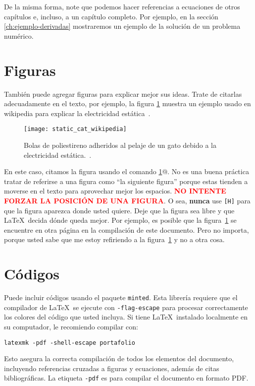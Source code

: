 \documentclass[../portafolio.tex]{subfiles}
\begin{document}
De la misma forma, note que podemos hacer referencias a ecuaciones de otros capítulos e, incluso, a un capítulo completo. Por ejemplo, en la sección \ref{ch:ejemplo-derivadas} mostraremos un ejemplo de la solución de un problema numérico.

\section{Figuras}
También puede agregar figuras para explicar mejor sus ideas. Trate de
citarlas adecuadamente en el texto, por ejemplo, la figura
\ref{fig:estatica} muestra un ejemplo usado en wikipedia
para explicar la electricidad estática~\cite{wikistatic}.
\begin{figure}[ht!]
  \centering
  \texttt{[image: static\_cat\_wikipedia]}
  \caption{Bolas de poliestireno adheridos al pelaje de un gato debido
    a la electricidad estática.~\cite{wikistatic}.}
  \label{fig:estatica}
\end{figure}

En este caso, citamos la figura usando el comando \verb@\ref{fig:estatica}@. No es una buena práctica tratar de referirse a una figura como ``la siguiente figura'' porque estas tienden a moverse en el texto para aprovechar mejor los espacios. \textcolor{red}{\bf NO INTENTE FORZAR LA POSICIÓN DE UNA FIGURA}. O sea, \textbf{nunca} use \texttt{[H]} para que la figura aparezca donde usted quiere. Deje que la figura sea libre y que \LaTeX\ decida dónde queda mejor. Por ejemplo, es posible que la figura~\ref{fig:estatica} se encuentre en otra página en la compilación de este documento. Pero no importa, porque usted sabe que me estoy refiriendo a la figura~\ref{fig:estatica} y no a otra cosa.


\section{Códigos}
Puede incluir códigos usando el paquete \texttt{minted}. Esta librería
requiere que el compilador de \LaTeX\ se ejecute con
\texttt{-flag-escape} para procesar correctamente los colores del
código que usted incluya. Si tiene \LaTeX\ instalado localmente en su
computador, le recomiendo compilar con:
\begin{verbatim}
latexmk -pdf -shell-escape portafolio 
\end{verbatim}
%
Esto asegura la correcta compilación de todos los elementos del
documento, incluyendo referencias cruzadas a figuras y ecuaciones,
además de citas bibliográficas. La etiqueta \texttt{-pdf} es para
compilar el documento en formato PDF.
\end{document}
